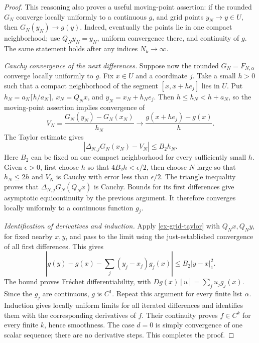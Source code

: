 \begin{proof}
This reasoning also proves a useful moving-point assertion: if the
rounded \(G_N\) converge locally uniformly to a continuous \(g\),
and grid points \(y_N\to y\in U\), then \(G_N(y_N)\to g(y)\).
Indeed, eventually the points lie in one compact neighborhood; use
\(Q_Ny_N=y_N\), uniform convergence there, and continuity of \(g\).
The same statement holds after any indices \(N_k\to\infty\).

\emph{Cauchy convergence of the next differences.}
Suppose now the rounded \(G_N=F_{N,\alpha}\) converge locally uniformly
to \(g\). Fix \(x\in U\) and a coordinate \(j\). Take a small
\(h>0\) such that a compact neighborhood of the segment
\([x,x+he_j]\) lies in \(U\). Put
\(h_N=a_N\lceil h/a_N\rceil\), \(x_N=Q_Nx\), and
\(y_N=x_N+h_Ne_j\). Then \(h\le h_N<h+a_N\), so the moving-point
assertion implies convergence of
\[
 V_N=\frac{G_N(y_N)-G_N(x_N)}{h_N}
 \longrightarrow\frac{g(x+he_j)-g(x)}h.
\]
The Taylor estimate gives
\[
 |\Delta_{N,j}G_N(x_N)-V_N|\le B_2h_N.
\]
Here \(B_2\) can be fixed on one compact neighborhood for every
sufficiently small \(h\). Given \(\epsilon>0\), first choose \(h\)
so that \(4B_2h<\epsilon/2\), then choose \(N\) large so that
\(h_N\le2h\) and \(V_N\) is Cauchy with error less than
\(\epsilon/2\). The triangle inequality proves that
\(\Delta_{N,j}G_N(Q_Nx)\) is Cauchy. Bounds for its first differences
give asymptotic equicontinuity by the previous argument. It therefore
converges locally uniformly to a continuous function \(g_j\).

\emph{Identification of derivatives and induction.}
Apply \eqref{ex-grid-taylor} with \(Q_Nx,Q_Ny\), for fixed nearby
\(x,y\), and pass to the limit using the just-established convergence
of all first differences. This gives
\[
 |g(y)-g(x)-\sum_j(y_j-x_j)g_j(x)|\le B_2|y-x|_1^2.
\]
The bound proves Fr\'echet differentiability, with
\(Dg(x)[u]=\sum_ju_jg_j(x)\). Since the \(g_j\) are continuous,
\(g\) is \(C^1\). Repeat this argument for every finite list
\(\alpha\). Induction gives locally uniform limits for all iterated
differences and identifies them with the corresponding derivatives of
\(f\). Their continuity proves \(f\in C^k\) for every finite \(k\),
hence smoothness. The case \(d=0\) is simply convergence of one scalar
sequence; there are no derivative steps. This completes the proof.
\end{proof}

